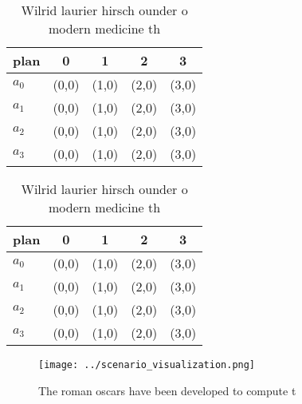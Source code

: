 \documentclass[a4paper]{article}
\begin{document}
\begin{table}
\begin{adjustbox}{width=0.5\columnwidth}
\begin{tabular}{|l|l|l|l|l|}
\hline
\textbf{plan} & \multicolumn{1}{c|}{\textbf{0}} & \multicolumn{1}{c|}{\textbf{1}} & \multicolumn{1}{c|}{\textbf{2}} & \multicolumn{1}{c|}{\textbf{3}} \\ \hline
\textbf{$a_0$}  & (0,0) & (1,0) & (2,0) & (3,0) \\ \hline
\textbf{$a_1$}  & (0,0) & (1,0) & (2,0) & (3,0) \\ \hline
\textbf{$a_2$}  & (0,0) & (1,0) & (2,0) & (3,0) \\ \hline
\textbf{$a_3$}  & (0,0) & (1,0) & (2,0) & (3,0) \\ \hline
\end{tabular}
\end{adjustbox}
\caption{Wilrid laurier hirsch ounder o modern medicine th
}
\end{table}

\begin{table}
\begin{adjustbox}{width=0.5\columnwidth}
\begin{tabular}{|l|l|l|l|l|}
\hline
\textbf{plan} & \multicolumn{1}{c|}{\textbf{0}} & \multicolumn{1}{c|}{\textbf{1}} & \multicolumn{1}{c|}{\textbf{2}} & \multicolumn{1}{c|}{\textbf{3}} \\ \hline
\textbf{$a_0$}  & (0,0) & (1,0) & (2,0) & (3,0) \\ \hline
\textbf{$a_1$}  & (0,0) & (1,0) & (2,0) & (3,0) \\ \hline
\textbf{$a_2$}  & (0,0) & (1,0) & (2,0) & (3,0) \\ \hline
\textbf{$a_3$}  & (0,0) & (1,0) & (2,0) & (3,0) \\ \hline
\end{tabular}
\end{adjustbox}
\caption{Wilrid laurier hirsch ounder o modern medicine th
}
\end{table}

\begin{figure}
\centering
\texttt{[image: ../scenario\_visualization.png]}
\caption{The roman oscars have been developed to compute t
}
\end{figure}
 
\end{document}
